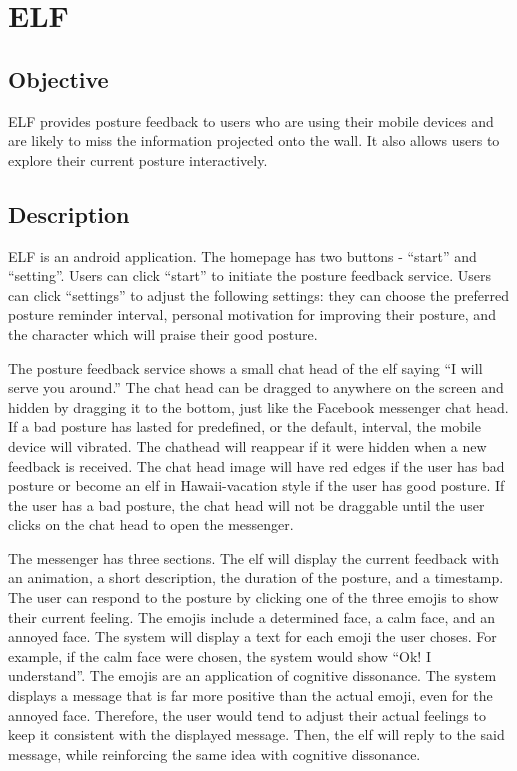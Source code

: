 \section{ELF}
\subsection{Objective}
ELF provides posture feedback to users who are using their mobile devices and are likely to miss the information projected onto the wall. It also allows users to explore their current posture interactively.

\subsection{Description}
ELF is an android application. The homepage has two buttons - ``start'' and ``setting''. Users can click ``start'' to initiate the posture feedback service. Users can click ``settings'' to adjust the following settings: they can choose the preferred posture reminder interval, personal motivation for improving their posture, and the character which will praise their good posture.

The posture feedback service shows a small chat head of the elf saying ``I will serve you around.'' The chat head can be dragged to anywhere on the screen and hidden by dragging it to the bottom, just like the Facebook messenger chat head. If a bad posture has lasted for predefined, or the default, interval, the mobile device will vibrated. The chathead will reappear if it were hidden when a new feedback is received. The chat head image will have red edges if the user has bad posture or become an elf in Hawaii-vacation style if the user has good posture. If the user has a bad posture, the chat head will not be draggable until the user clicks on the chat head to open the messenger.

The messenger has three sections. The elf will display the current feedback with an animation, a short description, the duration of the posture, and a timestamp. The user can respond to the posture by clicking one of the three emojis to show their current feeling. The emojis include a determined face, a calm face, and an annoyed face. The system will display a text for each emoji the user choses. For example, if the calm face were chosen, the system would show ``Ok! I understand''. The emojis are an application of cognitive dissonance. The system displays a message that is far more positive than the actual emoji, even for the annoyed face. Therefore, the user would tend to adjust their actual feelings to keep it consistent with the displayed message. Then, the elf will reply to the said message, while reinforcing the same idea with cognitive dissonance.

